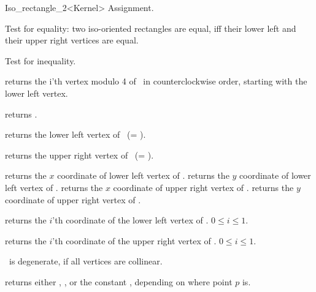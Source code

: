 \begin{ccRefClass} {Iso_rectangle_2<Kernel>}
\ccOperations
\ccHidden {}
        {Assignment.}

       {Test for equality: two iso-oriented rectangles are equal, iff their
        lower left and their upper right vertices are equal.}

       {Test for inequality.}

       {returns the i'th vertex modulo 4  of \ccVar\ in counterclockwise order, 
        starting with the lower left vertex.}

       {returns  .}

       {returns the lower left vertex of \ccVar\ (= ).}


       {returns the upper right vertex of \ccVar\ (= ).}

       {returns the $x$ coordinate of lower left vertex of \ccVar.}
\ccGlue
{}
       {returns the $y$ coordinate of lower left vertex of \ccVar.}
\ccGlue
{}
       {returns the $x$ coordinate of upper right vertex of \ccVar.}
\ccGlue
{}
       {returns the $y$ coordinate of upper right vertex of \ccVar.}

       {returns the $i$'th  coordinate of the
        lower left vertex of \ccVar. 
        \ccPrecond $0 \leq i \leq 1$.}

       {returns the $i$'th  coordinate of the
        upper right vertex of \ccVar. 
        \ccPrecond $0 \leq i \leq 1$.}

\ccPredicates

       {%
        \ccVar\ is degenerate, if all vertices
        are collinear.}

       {returns either ,
        , or the constant
        , 
        depending on where point $p$ is.}


\end{ccRefClass}
